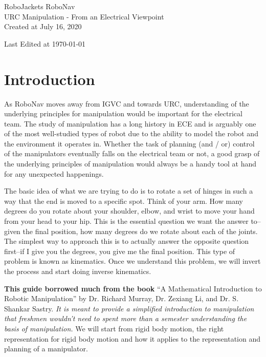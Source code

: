 \documentclass[letterpaper]{article}
\begin{document}
\begin{titlepage}
\centering
	{\LARGE RoboJackets RoboNav}\\
	\vspace{1cm}
	{\Large URC Manipulation - From an Electrical Viewpoint}\\
	\vfill
	{\large Created at July 16, 2020}\\
	\vspace{1cm}
	{\large Last Edited at \today\par}
\end{titlepage}
\pagebreak

\tableofcontents

\pagebreak

\section{Introduction}
As RoboNav moves away from IGVC and towards URC, understanding of the underlying principles for manipulation 
would be important for the electrical team. The study of manipulation has a long history in ECE and is arguably
one of the most well-studied types of robot due to the ability to model the robot and the environment it operates
in. Whether the task of planning (and / or) control of the manipulators eventually falls on the electrical team
or not, a good grasp of the underlying principles of manipulation would always be a handy tool at hand for any
unexpected happenings. 

The basic idea of what we are trying to do is to rotate a set of hinges in such a way that the end is moved to a 
specific spot. Think of your arm. How many degrees do you rotate about your shoulder, elbow, and wrist to move your 
hand from your head to your hip. This is the essential question we want the answer to--given the final position, how 
many degrees do we rotate about each of the joints. The simplest way to approach this is to actually answer the 
opposite question first--if I give you the degrees, you give me the final position. This type of problem is known 
as kinematics. Once we understand this problem, we will invert the process and start doing inverse kinematics.

\textbf{This guide borrowed much from the book} ``A Mathematical Introduction to Robotic Manipulation'' by
Dr. Richard Murray, Dr. Zexiang Li, and Dr. S. Shankar Sastry. \emph{It is meant to provide a simplified introduction
to manipulation that freshmen wouldn't need to spent more than a semester understanding the basis
of manipulation.} We will start from rigid body motion, the right representation for rigid body motion and how it
applies to the representation and planning of a manipulator.
\end{document}
